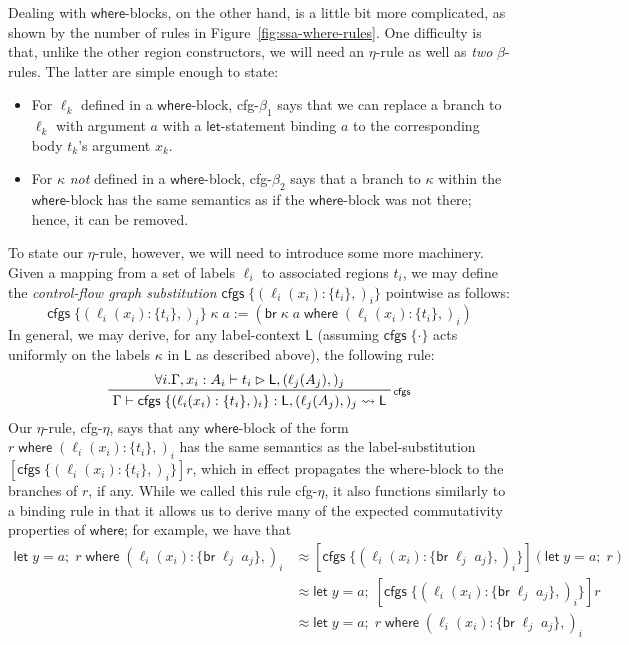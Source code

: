 \documentclass[acmsmall,screen,review]{acmart}
\newcommand{\ms}[1]{\ensuremath{\mathsf{#1}}}
\newcommand{\lto}{:}
\newcommand{\letexpr}[3]{\ensuremath{\ms{let}\;#1 = #2;\;#3}}
\newcommand{\brb}[2]{\ms{br}\;#1\;#2}
\newcommand{\where}[2]{#1\;\ms{where}\;#2}
\newcommand{\wbranch}[3]{#1(#2) \lto \{#3\}}
\newcommand{\cfgsubst}[1]{\ms{cfgs}\;\{#1\}}
\newcommand{\bhyp}[2]{#1 : #2}
\newcommand{\lhyp}[2]{#1(#2)}
\newcommand{\rle}[1]{{\scriptsize\textsf{#1}}}
\newcommand{\haslb}[3]{#1 \vdash #2 \rhd #3}
\newcommand{\lbsubst}[4]{#1 \vdash #2: #3 \rightsquigarrow #4}
\newcommand{\teqv}{\approx}
\newcommand{\brle}[1]{{\textsf{#1}}}
\begin{document}
Dealing with \ms{where}-blocks, on the other hand, is a little bit more complicated, as shown by the
number of rules in Figure~\ref{fig:ssa-where-rules}. One difficulty is that, unlike the other region
constructors, we will need an $\eta$-rule as well as \emph{two} $\beta$-rules. The latter are simple
enough to state:
\begin{itemize}
  \item For $\ell_k$ defined in a \ms{where}-block, \brle{cfg-$\beta_1$} says that we can replace a
  branch to $\ell_k$ with argument $a$ with a \ms{let}-statement binding $a$ to the corresponding
  body $t_k$'s argument $x_k$.
  \item For $\kappa$ \emph{not} defined in a \ms{where}-block, \brle{cfg-$\beta_2$} says that
  a branch to $\kappa$ within the \ms{where}-block has the same semantics as if the \ms{where}-block
  was not there; hence, it can be removed.
\end{itemize}
To state our $\eta$-rule, however, we will need to introduce some more machinery. Given a mapping
from a set of labels $\ell_i$ to associated regions $t_i$, we may define the \emph{control-flow
graph substitution} $\cfgsubst{(\wbranch{\ell_i}{x_i}{t_i},)_i}$ pointwise as follows:
\begin{equation}
  \cfgsubst{(\wbranch{\ell_i}{x_i}{t_i},)_i}\;\kappa\;a
  := (\where{\brb{\kappa}{a}}{(\wbranch{\ell_i}{x_i}{t_i},)_i})
\end{equation}
In general, we may derive, for any label-context $\ms{L}$ (assuming $\cfgsubst{\cdot}$ acts uniformly
on the labels $\kappa$ in $\ms{L}$ as described above), the following rule:
\begin{equation}
  \prftree[r]{\rle{cfgs}}
    {\forall i. \haslb{\Gamma, \bhyp{x_i}{A_i}}{t_i}{\ms{L}, (\lhyp{\ell_j}{A_j},)_j}}
    {\lbsubst{\Gamma}
      {\cfgsubst{(\wbranch{\ell_i}{x_i}{t_i},)_i}}{\ms{L}, (\lhyp{\ell_j}{A_j},)_j}{\ms{L}}}
\end{equation}
Our $\eta$-rule, \brle{cfg-$\eta$}, says that any \ms{where}-block of the form
$\where{r}{(\wbranch{\ell_i}{x_i}{t_i},)_i}$ has the same semantics as the label-substitution
$[\cfgsubst{(\wbranch{\ell_i}{x_i}{t_i},)_i}]r$, which in effect propagates the where-block to the
branches of $r$, if any. While we called this rule \brle{cfg-$\eta$}, it also functions similarly
to a binding rule in that it allows us to derive many of the expected commutativity properties of
\ms{where}; for example, we have that
\begin{align*}
  \where{\letexpr{y}{a}{r}}{(\wbranch{\ell_i}{x_i}{\brb{\ell_j}{a_j}},)_i}
  &\teqv [\cfgsubst{(\wbranch{\ell_i}{x_i}{\brb{\ell_j}{a_j}},)_i}](\letexpr{y}{a}{r}) \\
  &\teqv \letexpr{y}{a}{[\cfgsubst{(\wbranch{\ell_i}{x_i}{\brb{\ell_j}{a_j}},)_i}]r} \\
  &\teqv \letexpr{y}{a}{\where{r}{(\wbranch{\ell_i}{x_i}{\brb{\ell_j}{a_j}},)_i}}
\end{align*}
\end{document}
